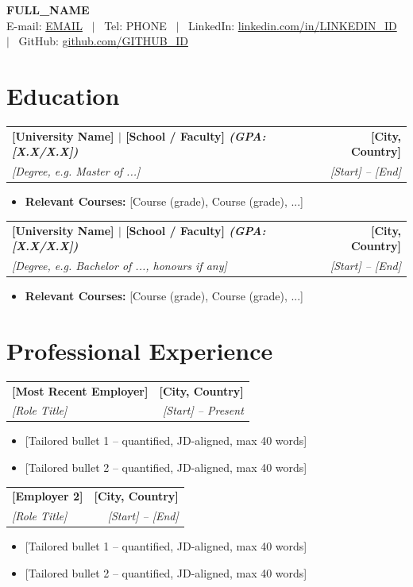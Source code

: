 \documentclass[a4paper,10pt]{article}
\makeatletter
\newcommand{\resumeItem}[1]{%
  \item\small{#1}\vspace{1pt}
}
\newcommand{\resumeEduHeading}[4]{%
  \begin{tabular*}{\textwidth}{l@{\extracolsep{\fill}}r}
    \textbf{#1} & \textbf{#2} \\
    \textit{\small #3} & \textit{\small #4} \\
  \end{tabular*}\vspace{-4pt}
}
\newcommand{\resumeJobHeading}[4]{%
  \begin{tabular*}{\textwidth}{l@{\extracolsep{\fill}}r}
    \textbf{#1} & \textbf{#2} \\
    \textit{\small #3} & \textit{\small #4} \\
  \end{tabular*}\vspace{-4pt}
}
\newcommand{\resumeItemListStart}{%
  \begin{itemize}[leftmargin=0.15in, itemsep=0pt, topsep=3pt, parsep=0pt]
}
\newcommand{\resumeItemListEnd}{%
  \end{itemize}\vspace{1pt}
}
\makeatother
\begin{document}
\begin{center}
  {\LARGE\bfseries {{FULL_NAME}}}\\[4pt]
  \small
  E-mail: \href{mailto:{{EMAIL}}}{{{EMAIL}}}
  ~$|$~ Tel: {{PHONE}}
  ~$|$~ LinkedIn: \href{https://linkedin.com/in/{{LINKEDIN_ID}}}{linkedin.com/in/{{LINKEDIN_ID}}}
  ~$|$~ GitHub: \href{https://github.com/{{GITHUB_ID}}}{github.com/{{GITHUB_ID}}}
\end{center}
\vspace{-6pt}

\section{Education}

\resumeEduHeading
  {[University Name] $|$ [School / Faculty]
   \normalfont\textit{(GPA: [X.X/X.X])}}
  {[City, Country]}
  {[Degree, e.g. Master of ...]}
  {[Start] -- [End]}
\resumeItemListStart
  \resumeItem{\textbf{Relevant Courses:} [Course (grade), Course (grade), ...]}
\resumeItemListEnd

\resumeEduHeading
  {[University Name] $|$ [School / Faculty]
   \normalfont\textit{(GPA: [X.X/X.X])}}
  {[City, Country]}
  {[Degree, e.g. Bachelor of ..., honours if any]}
  {[Start] -- [End]}
\resumeItemListStart
  \resumeItem{\textbf{Relevant Courses:} [Course (grade), Course (grade), ...]}
\resumeItemListEnd

\section{Professional Experience}

\resumeJobHeading
  {[Most Recent Employer]}{[City, Country]}
  {[Role Title]}{[Start] -- Present}
\resumeItemListStart
  \resumeItem{[Tailored bullet 1 -- quantified, JD-aligned, max 40 words]}
  \resumeItem{[Tailored bullet 2 -- quantified, JD-aligned, max 40 words]}
\resumeItemListEnd

\resumeJobHeading
  {[Employer 2]}{[City, Country]}
  {[Role Title]}{[Start] -- [End]}
\resumeItemListStart
  \resumeItem{[Tailored bullet 1 -- quantified, JD-aligned, max 40 words]}
  \resumeItem{[Tailored bullet 2 -- quantified, JD-aligned, max 40 words]}
\resumeItemListEnd
\end{document}
